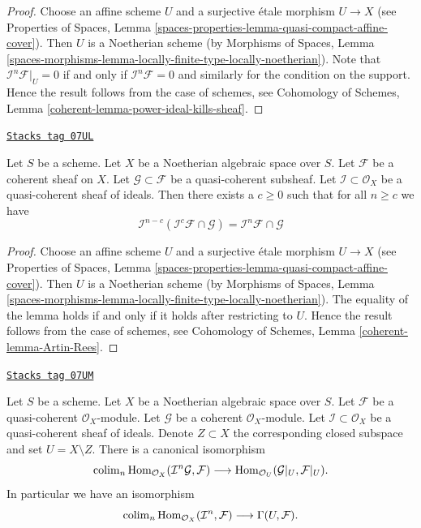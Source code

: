 \begin{proof}
Choose an affine scheme $U$ and a surjective \'etale morphism $U \to X$
(see Properties of Spaces, Lemma
\ref{spaces-properties-lemma-quasi-compact-affine-cover}).
Then $U$ is a Noetherian scheme (by
Morphisms of Spaces, Lemma
\ref{spaces-morphisms-lemma-locally-finite-type-locally-noetherian}).
Note that $\mathcal{I}^n\mathcal{F}|_U = 0$ if and only if
$\mathcal{I}^n\mathcal{F} = 0$ and similarly for the condition on
the support. Hence the result follows from the case of schemes, see
Cohomology of Schemes, Lemma \ref{coherent-lemma-power-ideal-kills-sheaf}.
\end{proof}

\begin{lemma}

\label{spaces-cohomology-lemma-Artin-Rees}
\href{https://stacks.math.columbia.edu/tag/07UL}{\texttt{Stacks tag 07UL}}

Let $S$ be a scheme. Let $X$ be a Noetherian algebraic space over $S$.
Let $\mathcal{F}$ be a coherent sheaf on $X$. Let
$\mathcal{G} \subset \mathcal{F}$ be a quasi-coherent subsheaf.
Let $\mathcal{I} \subset \mathcal{O}_X$ be a quasi-coherent sheaf of
ideals. Then there exists a $c \geq 0$ such that for all $n \geq c$ we
have
$$
\mathcal{I}^{n - c}(\mathcal{I}^c\mathcal{F} \cap \mathcal{G})
=
\mathcal{I}^n\mathcal{F} \cap \mathcal{G}
$$
\end{lemma}

\begin{proof}
Choose an affine scheme $U$ and a surjective \'etale morphism $U \to X$
(see Properties of Spaces, Lemma
\ref{spaces-properties-lemma-quasi-compact-affine-cover}).
Then $U$ is a Noetherian scheme (by
Morphisms of Spaces, Lemma
\ref{spaces-morphisms-lemma-locally-finite-type-locally-noetherian}).
The equality of the lemma holds if and only if it holds after
restricting to $U$. Hence the result follows from the case of schemes, see
Cohomology of Schemes, Lemma \ref{coherent-lemma-Artin-Rees}.
\end{proof}

\begin{lemma}
\label{spaces-cohomology-lemma-homs-over-open}
\href{https://stacks.math.columbia.edu/tag/07UM}{\texttt{Stacks tag 07UM}}

Let $S$ be a scheme. Let $X$ be a Noetherian algebraic space over $S$.
Let $\mathcal{F}$ be a quasi-coherent $\mathcal{O}_X$-module.
Let $\mathcal{G}$ be a coherent $\mathcal{O}_X$-module.
Let $\mathcal{I} \subset \mathcal{O}_X$ be a quasi-coherent sheaf of
ideals. Denote $Z \subset X$ the corresponding closed subspace and
set $U = X \setminus Z$. There is a canonical isomorphism
$$
\operatorname{colim}_n \operatorname{Hom}_{\mathcal{O}_X}(\mathcal{I}^n\mathcal{G}, \mathcal{F})
\longrightarrow
\operatorname{Hom}_{\mathcal{O}_U}(\mathcal{G}|_U, \mathcal{F}|_U).
$$
In particular we have an isomorphism
$$
\operatorname{colim}_n \operatorname{Hom}_{\mathcal{O}_X}(\mathcal{I}^n, \mathcal{F})
\longrightarrow
\Gamma(U, \mathcal{F}).
$$
\end{lemma}

